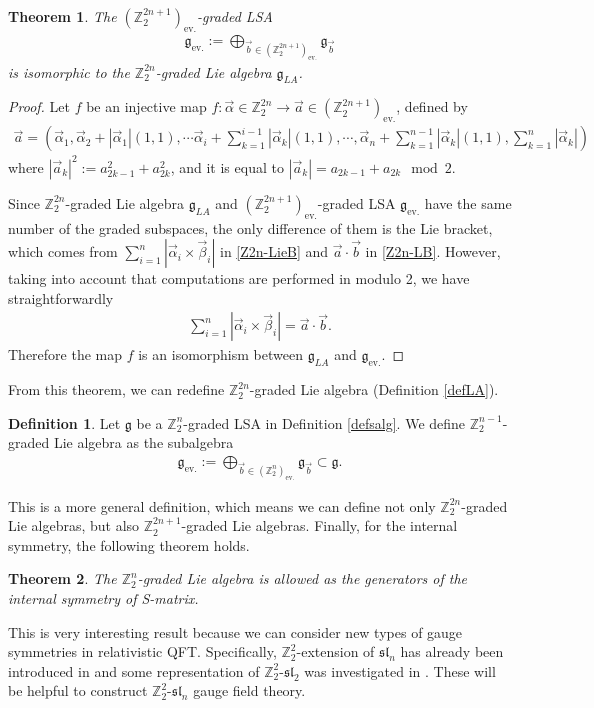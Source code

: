 \documentclass[a4paper,12pt]{article}
\def\Z{\mathbb{Z}}
\def\ua{\alpha}
\def\ub{\beta}
\def\g{\mathfrak{g}}
\def\ev{\text{ev.}}
\theoremstyle{plain}
\newtheorem{thm}{Theorem}
\theoremstyle{definition}
\newtheorem{dfn}{Definition}
\begin{document}
\begin{thm}
 The $(\Z_2^{2n+1})_{\ev}$-graded LSA 
\begin{align}
\g_{\ev}:=\bigoplus_{\vec{b}\in(\Z_2^{2n+1})_{\ev}}\g_{\vec{b}}
\end{align}
 is isomorphic to the $\Z_2^{2n}$-graded Lie algebra $\g_{LA}$.
\end{thm}
\begin{proof}
Let $f$ be an injective map $f: \vec{\ua}\in \Z_2^{2n}\to\vec{a}\in(\Z_2^{2n+1})_{\ev}$, defined by
\begin{align*}
\vec{a}=\left( \vec{\ua}_1, \vec{\ua}_2+|\vec{\ua}_1|(1,1),\cdots \vec{\ua}_i+\sum_{k=1}^{i-1}|\vec{\ua}_k|(1,1),\cdots, \vec{\ua}_{n}+\sum_{k=1}^{n-1}|\vec{\ua}_k|(1,1), \sum_{k=1}^{n}|\vec{\alpha}_k| \right)
\end{align*}
where  $|\vec{a}_k|^2:=a_{2k-1}^2+a_{2k}^2$, and it is equal to $|\vec{a}_k|=a_{2k-1}+a_{2k} \mod 2$.

Since $\Z_2^{2n}$-graded Lie algebra $\g_{LA}$ and $(\Z_2^{2n+1})_{\ev}$-graded LSA $\g_{\ev}$ have the same number of the graded subspaces, the only difference of them is the Lie bracket, which comes from $\sum_{i=1}^n |\vec{\ua}_i\times \vec{\ub}_i|$ in \eqref{Z2n-LieB} and $\vec{a}\cdot \vec{b}$ in \eqref{Z2n-LB}. However, taking into account that computations are performed in modulo 2, we have straightforwardly 
\begin{align}
 \sum_{i=1}^n |\vec{\ua}_i\times \vec{\ub}_i|=\vec{a}\cdot \vec{b}.
\end{align}
Therefore the map $f$ is an isomorphism between $\g_{LA}$ and $\g_{\ev}$.
\end{proof}
From this theorem, we can redefine $\Z_2^{2n}$-graded Lie algebra (Definition \ref{defLA}).
\begin{dfn}
 Let $\g$ be a $\Z_2^{n}$-graded LSA in Definition \ref{defsalg}. We define $\Z_2^{n-1}$-graded Lie algebra as the subalgebra 
\begin{align}
 \g_{\ev}:=\bigoplus_{\vec{b}\in(\Z_2^n)_{\ev}}\g_{\vec{b}}\subset \g.
\end{align}
\end{dfn}
This is a more general definition, which means we can define not only $\Z_2^{2n}$-graded Lie algebras, but also $\Z_2^{2n+1}$-graded Lie algebras. Finally, for the internal symmetry, the following theorem holds.
\begin{thm}
 The $\Z_2^n$-graded Lie algebra is allowed as the generators of the internal symmetry of S-matrix.
\end{thm}
This is very interesting result because we can consider new types of gauge symmetries in relativistic QFT.
Specifically, $\Z_2^2$-extension of $\mathfrak{sl}_n$ has already been introduced in \cite{RW2} and some representation of $\Z_2^2$-$\mathfrak{sl}_2$ was investigated in \cite{AIKTT}. These will be helpful to construct $\Z_2^2$-$\mathfrak{sl}_n$ gauge field theory.
\end{document}
